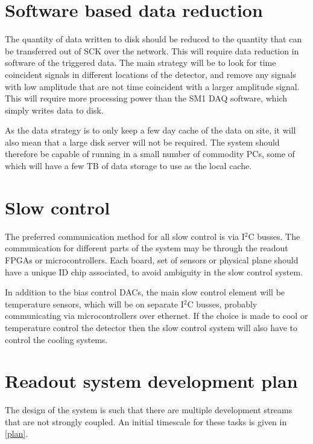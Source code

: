 \documentclass[a4paper]{article}
\begin{document}
\section{Software based data reduction}

The quantity of data written to disk should be reduced to the quantity that can be transferred out of SCK over the network.
This will require data reduction in software of the triggered data.
The main strategy will be to look for time coincident signals in different locations of the detector, and remove any signals with low amplitude that are not time coincident with a larger amplitude signal.
This will require more processing power than the SM1 DAQ software, which simply writes data to disk.

As the data strategy is to only keep a few day cache of the data on site, it will also mean that a large disk server will not be required.
The system should therefore be capable of running in a small number of commodity PCs, some of which will have a few TB of data storage to use as the local cache.

\section{Slow control}

The preferred communication method for all slow control is via I$^2$C busses.
The communication for different parts of the system may be through the readout FPGAs or microcontrollers.
Each board, set of sensors or physical plane should have a unique ID chip associated, to avoid ambiguity in the slow control system.

In addition to the bias control DACs, the main slow control element will be temperature sensors, which will be on separate I$^2$C busses, probably communicating via microcontrollers over ethernet.
If the choice is made to cool or temperature control the detector then the slow control system will also have to control the cooling systems.

\section{Readout system development plan}

The design of the system is such that there are multiple development streams that are not strongly coupled.
An initial timescale for these tasks is given in \cref{plan}.
\end{document}
